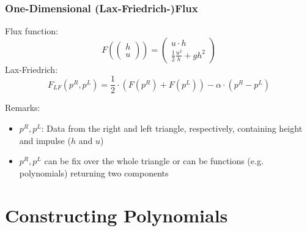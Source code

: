 \documentclass{beamer}
\begin{document}
\begin{frame}
  \frametitle{One-Dimensional (Lax-Friedrich-)Flux}
  Flux function:
  \begin{equation}
    \label{eq:flux-function-definition}
    F\left(
      \begin{pmatrix}
        h \\ u
      \end{pmatrix}
    \right) = 
    \begin{pmatrix}
      u \cdot h \\
      \frac{1}{2} \frac{u^2}{h} + g h^2 
    \end{pmatrix}
  \end{equation}
  Lax-Friedrich:
  \begin{equation}
    \label{eq:lax-friedrich-definition}
    F_{LF}(p^R,p^L) = \dfrac{1}{2}\cdot (F(p^R) + F(p^L)) - \alpha \cdot (p^R - p^L)
  \end{equation}
  \begin{block}{Remarks:}
    \begin{itemize}
    \item $p^R, p^L$: Data from the right and left triangle, respectively, containing height and impulse ($h$ and $u$)
    \item $p^R, p^L$ can be fix over the whole triangle or can be functions (e.g. polynomials) returning two components
    \end{itemize}
  \end{block}
\end{frame}

\section{Constructing Polynomials}
\label{sec:constructing-polynomials}
\end{document}
